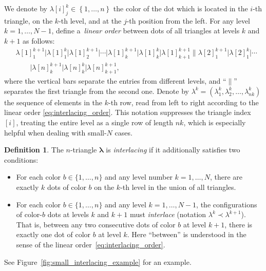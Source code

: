 \documentclass[pdftex]{sigma}
\numberwithin{equation}{section}
\theoremstyle{definition}
\newtheorem{Definition}[Theorem]{Definition}
\begin{document}
	We denote by $\lambda[i]^{k}_{j} \in\left\{ 1,\dots,n  \right\}$ the color
	of the dot which is located in the $i$-th triangle, on the $k$-th level, and
	at the $j$-th position from the left.
	For any level $k=1,\dots,N-1$, define a~\emph{linear order} between dots
	of all triangles at
	levels $k$ and $k+1$ as follows:
	\begin{align}
		& \lambda[1]^{k+1}_{1} \big\vert
		\lambda[1]^{k}_{1} \big\vert \lambda[1]^{k+1}_{2} \big\vert \cdots \big\vert
		\lambda[1]^{k+1}_{k} \big\vert \lambda[1]^k_k \big\vert
		\lambda[1]^{k+1}_{k+1}
		\big\|
		\lambda[2]^{k+1}_1 \big\vert \lambda[2]^k_1 \big\vert
		\cdots \nonumber\\
&\qquad \big\vert \lambda[n]^{k+1}_k \big\vert \lambda[n]^k_k \big\vert
		\lambda[n]^{k+1}_{k+1},\label{eq:interlacing_order}
	\end{align}
	where the vertical bars separate the entries from different levels,
	and ``$\|$'' separates the first triangle from the second one.
	Denote by $\lambda^{k}=(\lambda^k_1,\lambda^k_2,\dots,\lambda^k_{nk})$ the
	sequence of elements in the $k$-th row, read from left to right according to
	the linear order \eqref{eq:interlacing_order}.
	This notation suppresses the triangle index $[i]$, treating the entire level
	as a single row of length $nk$, which is especially helpful when dealing
	with small-$N$ cases.

\begin{Definition}
	\label{def:colored_interlacing_triangle} The $n$-triangle $\boldsymbol\lambda$ is \emph{interlacing} if it additionally satisfies two conditions:
	\begin{itemize}\itemsep=0pt
		\item For each color $b\in \{ 1,\dots,n  \}$
		and any level number $k=1,\dots,N$, there are exactly $k$ dots of color
		$b$ on the $k$-th level in the union of all triangles.
		\item
		For each color $b\in \{ 1,\dots,n  \}$ and any level
		$k=1,\dots,N-1$, the configurations of color-$b$ dots at levels $k$ and
		$k+1$ must \emph{interlace} (notation $\lambda^k\prec \lambda^{k+1}$).
		That is, between any two consecutive dots of color $b$ at level $k+1$,
		there is exactly one dot of color $b$ at level $k$.
		Here ``between'' is understood in the sense of the linear order~\eqref{eq:interlacing_order}.
	\end{itemize}
	See Figure~\ref{fig:small_interlacing_example} for an example.
\end{Definition}
\end{document}
